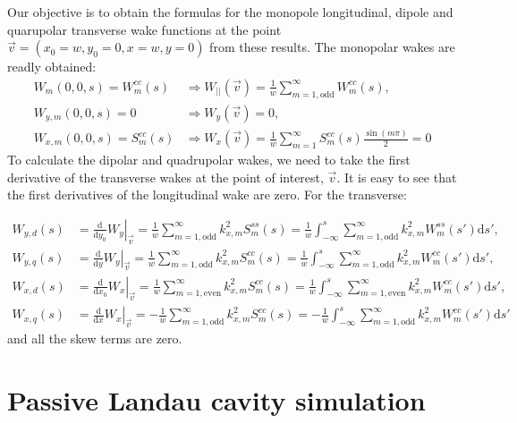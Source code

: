 \begin{apendicesenv}
    Our objective is to obtain the formulas for the monopole longitudinal, dipole and quarupolar transverse wake functions at the point $\vec{v} = (x_0=w,y_0=0,x=w,y=0)$ from these results. The monopolar wakes are readly obtained:
    \begin{align}
		W_m(0,0,s) = W^{cc}_m(s) &\Rightarrow W_{||}(\vec{v}) = \frac1w\sum^\infty_{m=1,\mathrm{odd}} W^{cc}_m(s), \\[4mm]
		W_{y,m}(0,0,s) = 0 &\Rightarrow W_y(\vec{v}) = 0, \\[4mm]
		W_{x,m}(0,0,s) = S^{cc}_m(s) &\Rightarrow W_x(\vec{v}) = \frac1w\sum^\infty_{m=1} S^{cc}_m(s)\frac{\sin(m\pi)}{2} = 0
    \end{align}
    To calculate the dipolar and quadrupolar wakes, we need to take the first derivative of the transverse wakes at the point of interest, $\vec{v}$. It is easy to see that the first derivatives of the longitudinal wake are zero. For the transverse:

    \begin{align}
		W_{y,d}(s) &= \left.\frac{\mathrm{d}}{\mathrm{d}y_0}W_y\right|_{\vec{v}} = \frac1w\sum^\infty_{m=1,\mathrm{odd}} k_{x,m}^2 S^{ss}_m(s) = \frac1w\int_{-\infty}^s\sum^\infty_{m=1,\mathrm{odd}} k_{x,m}^2 W^{ss}_m(s') \mathrm{d}s',\\[4mm]
		W_{y,q}(s) &= \left.\frac{\mathrm{d}}{\mathrm{d}y}W_y\right|_{\vec{v}} = \frac1w\sum^\infty_{m=1,\mathrm{odd}} k_{x,m}^2 S^{cc}_m(s) = \frac1w\int_{-\infty}^s\sum^\infty_{m=1,\mathrm{odd}} k_{x,m}^2 W^{cc}_m(s') \mathrm{d}s', \\[4mm]
		W_{x,d}(s) &= \left.\frac{\mathrm{d}}{\mathrm{d}x_0}W_x\right|_{\vec{v}} = \frac1w\sum^\infty_{m=1,\mathrm{even}} k_{x,m}^2 S^{cc}_m(s) = \frac1w\int_{-\infty}^s\sum^\infty_{m=1,\mathrm{even}}k_{x,m}^2 W^{cc}_m(s') \mathrm{d}s', \\[4mm]
		W_{x,q}(s) &= \left.\frac{\mathrm{d}}{\mathrm{d}x}W_x\right|_{\vec{v}} = -\frac1w\sum^\infty_{m=1,\mathrm{odd}} k_{x,m}^2 S^{cc}_m(s) =-\frac1w\int_{-\infty}^s\sum^\infty_{m=1,\mathrm{odd}} k_{x,m}^2 W^{cc}_m(s') \mathrm{d}s'
    \end{align}
    and all the skew terms are zero.


\chapter{Passive Landau cavity simulation}


\end{apendicesenv}
